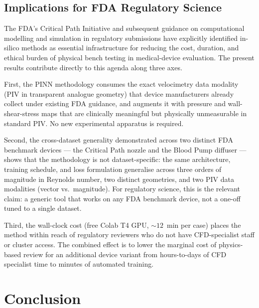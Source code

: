 \documentclass[12pt,a4paper]{article}
\begin{document}
\subsection{Implications for FDA Regulatory Science}
\label{sec:discuss_regulatory}

The FDA's Critical Path Initiative
\cite{FDACriticalPath2004} and subsequent guidance on
computational modelling and simulation in regulatory submissions
\cite{FDA2021InSilico} have explicitly identified in-silico
methods as essential infrastructure for reducing the cost,
duration, and ethical burden of physical bench testing in
medical-device evaluation. The present results contribute
directly to this agenda along three axes.

First, the PINN methodology consumes the exact velocimetry data
modality (PIV in transparent analogue geometry) that device
manufacturers already collect under existing FDA guidance, and
augments it with pressure and wall-shear-stress maps that are
clinically meaningful but physically unmeasurable in standard
PIV. No new experimental apparatus is required.

Second, the cross-dataset generality demonstrated across two
distinct FDA benchmark devices ---  the Critical Path nozzle and
the Blood Pump diffuser --- shows that the methodology is not
dataset-specific: the same architecture, training schedule, and
loss formulation generalise across three orders of magnitude in
Reynolds number, two distinct geometries, and two PIV data
modalities (vector vs.\ magnitude). For regulatory science, this
is the relevant claim: a generic tool that works on any FDA
benchmark device, not a one-off tuned to a single dataset.

Third, the wall-clock cost (free Colab T4 GPU, $\sim\!12$~min
per case) places the method within reach of regulatory reviewers
who do not have CFD-specialist staff or cluster access. The
combined effect is to lower the marginal cost of physics-based
review for an additional device variant from hours-to-days of
CFD specialist time to minutes of automated training.

\section{Conclusion}
\label{sec:conclusion}
\end{document}
